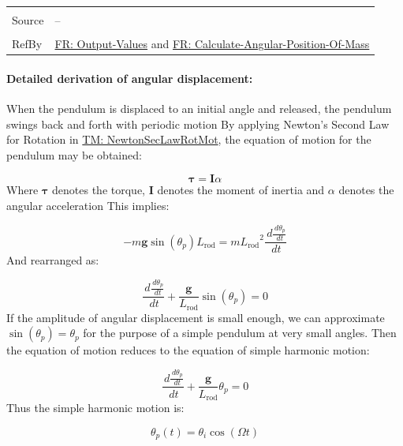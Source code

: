 \documentclass[12pt]{article}
\begin{document}
\begin{minipage}{\textwidth}
\begin{tabular}{>{\raggedright}p{}>{\raggedright\arraybackslash}p{}}
\\ \midrule \\
Source & --
         
\\ \midrule \\
RefBy & \hyperref[outputValues]{FR: Output-Values} and \hyperref[calcAngPos]{FR: Calculate-Angular-Position-Of-Mass}
        
\\ \bottomrule
\end{tabular}
\end{minipage}
\paragraph{Detailed derivation of angular displacement:}
\label{IM:calOfAngularDisplacementDeriv}
When the pendulum is displaced to an initial angle and released, the pendulum swings back and forth with periodic motion By applying Newton's Second Law for Rotation in \hyperref[TM:NewtonSecLawRotMot]{TM: NewtonSecLawRotMot}, the equation of motion for the pendulum may be obtained:

\begin{displaymath}
\mathbf{τ}=\mathbf{I} α
\end{displaymath}
Where $\mathbf{τ}$ denotes the torque, $\mathbf{I}$ denotes the moment of inertia and $α$ denotes the angular acceleration This implies:

\begin{displaymath}
-m \mathbf{g} \sin\left({θ_{p}}\right) {L_{\text{rod}}}=m {L_{\text{rod}}}^{2} \frac{\,d\frac{\,d{θ_{p}}}{\,dt}}{\,dt}
\end{displaymath}
And rearranged as:

\begin{displaymath}
\frac{\,d\frac{\,d{θ_{p}}}{\,dt}}{\,dt}+\frac{\mathbf{g}}{{L_{\text{rod}}}} \sin\left({θ_{p}}\right)=0
\end{displaymath}
If the amplitude of angular displacement is small enough, we can approximate $\sin\left({θ_{p}}\right)={θ_{p}}$ for the purpose of a simple pendulum at very small angles. Then the equation of motion reduces to the equation of simple harmonic motion:

\begin{displaymath}
\frac{\,d\frac{\,d{θ_{p}}}{\,dt}}{\,dt}+\frac{\mathbf{g}}{{L_{\text{rod}}}} {θ_{p}}=0
\end{displaymath}
Thus the simple harmonic motion is:

\begin{displaymath}
{θ_{p}}\left(t\right)={θ_{i}} \cos\left(Ω t\right)
\end{displaymath}
\end{document}

